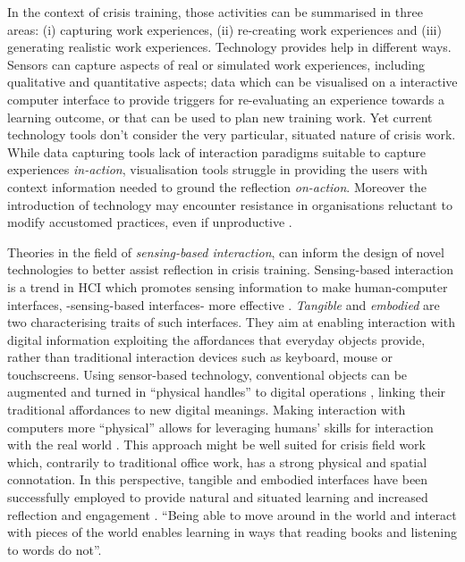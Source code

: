 In the context of crisis training, those activities can be summarised in three areas: (i) capturing work experiences, (ii) re-creating work experiences and (iii) generating realistic work experiences. Technology provides help in different ways. Sensors can capture aspects of real or simulated work experiences, including qualitative and quantitative aspects; data which can be visualised on a interactive computer interface to provide triggers for re-evaluating an experience towards a learning outcome, or that can be used to plan new training work. Yet current technology tools don't consider the very particular, situated nature of crisis work. While data capturing tools lack of interaction paradigms suitable to capture experiences \emph{in-action}, visualisation tools struggle in providing the users with context information needed to ground the reflection \emph{on-action}. Moreover the introduction of technology may encounter resistance in organisations reluctant to modify accustomed practices, even if unproductive \autocite{JCCM:JCCM15}.

Theories in the field of \emph{sensing-based interaction}, can inform the design of novel technologies to better assist reflection in crisis training. Sensing-based interaction is a trend in HCI which promotes sensing information to make human-computer interfaces, -sensing-based interfaces- more effective \autocite{Zhai:2005jm}. \emph{Tangible} and \emph{embodied} \autocite{Dourish:2001vc} are two characterising traits of such interfaces. They aim at enabling interaction with digital information exploiting the affordances that everyday objects provide, rather than traditional interaction devices such as keyboard, mouse or touchscreens. Using sensor-based technology, conventional objects can be augmented and turned in ``physical handles'' to digital operations \autocite{Ishii:1997ur}, linking their traditional affordances to new digital meanings. Making interaction with computers more ``physical'' allows for leveraging humans' skills for interaction with the real world \autocite{Shaer:2009fx}. This approach might be well suited for crisis field work which, contrarily to traditional office work, has a strong physical and spatial connotation. In this perspective, tangible and embodied interfaces have been successfully employed to provide natural \autocite{Terrenghi:2005gq} and situated \autocite{Klemmer:2006ez} learning and increased reflection and engagement \autocite{Rogers:2006te}. ``Being able to move around in the world and interact with pieces of the world enables learning in ways that reading books and listening to words do not''. \autocite{Klemmer:2006ez}

